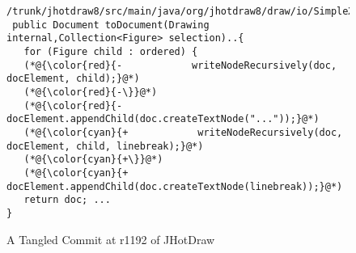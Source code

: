 \begin{figure}[t]
\begin{lstlisting}[]
 /trunk/jhotdraw8/src/main/java/org/jhotdraw8/draw/io/SimpleXmlIO.java
 public Document toDocument(Drawing internal,Collection<Figure> selection)..{
   for (Figure child : ordered) {
   (*@{\color{red}{-            writeNodeRecursively(doc, docElement, child);}@*)
   (*@{\color{red}{-\}}@*)
   (*@{\color{red}{-          docElement.appendChild(doc.createTextNode("..."));}@*)
   (*@{\color{cyan}{+            writeNodeRecursively(doc, docElement, child, linebreak);}@*)
   (*@{\color{cyan}{+\}}@*)
   (*@{\color{cyan}{+          docElement.appendChild(doc.createTextNode(linebreak));}@*)
   return doc; ...
}
	\end{lstlisting}
        \vspace{-15pt}
        \caption{A Tangled Commit at r1192 of JHotDraw}
        \vspace{-6pt}
        \label{fig:motiv-cc}
\end{figure}

